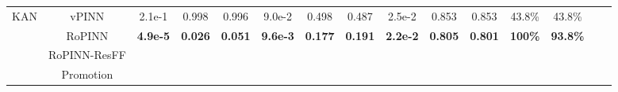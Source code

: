 \begin{table}[t]
\begin{small}
\begin{tabular}{lcccccccccccccc}
                     KAN \cite{liu2024kan} & vPINN & 2.1e-1 & 0.998 & 0.996 & \cellcolor{tablelightblue}9.0e-2 & \cellcolor{tablelightblue}0.498 & \cellcolor{tablelightblue}0.487 & \cellcolor{tablelightblue}2.5e-2 & \cellcolor{tablelightblue}0.853 & \cellcolor{tablelightblue}0.853 & 43.8\% & 43.8\% \\
                     & RoPINN & \cellcolor{tablelightblue}\textbf{4.9e-5} & \cellcolor{tablelightblue}\textbf{0.026} & \cellcolor{tablelightblue}\textbf{0.051} & \cellcolor{tablelightblue}\textbf{9.6e-3} & \cellcolor{tablelightblue}\textbf{0.177} & \cellcolor{tablelightblue}\textbf{0.191} & \cellcolor{tablelightblue}\textbf{2.2e-2} & \cellcolor{tablelightblue}\textbf{0.805} & \cellcolor{tablelightblue}\textbf{0.801} & \multirow{2}{*}{\textbf{100\%}} & \multirow{2}{*}{\textbf{93.8\%}} \\
                     \cmidrule(lr){2-13}
                     & RoPINN-ResFF &  &  &  &  &  &  &  &  &  &  &  \\
                     & Promotion &  &  &  &  &  &  &  &  &  &  & \\
        \bottomrule
      \end{tabular}
  \end{small}
    \vspace{-15pt}
\end{table}
